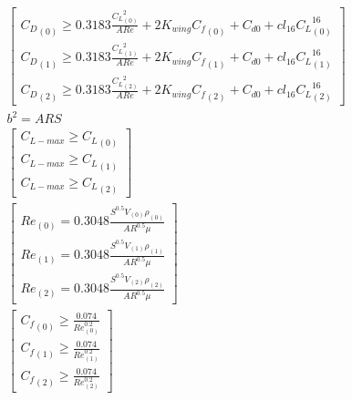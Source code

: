 \documentclass[10pt, a4paper]{article}
\begin{document}
\[ \begin{array}{ll}
	& \begin{bmatrix}{C_D}_{(0)} \geq 0.3183\frac{{C_L}_{(0)}^{2}}{AR e} + 2K_{wing} {C_f}_{(0)} + C_{d0} + cl_{16} {C_L}_{(0)}^{16} \\ {C_D}_{(1)} \geq 0.3183\frac{{C_L}_{(1)}^{2}}{AR e} + 2K_{wing} {C_f}_{(1)} + C_{d0} + cl_{16} {C_L}_{(1)}^{16} \\ {C_D}_{(2)} \geq 0.3183\frac{{C_L}_{(2)}^{2}}{AR e} + 2K_{wing} {C_f}_{(2)} + C_{d0} + cl_{16} {C_L}_{(2)}^{16}\end{bmatrix} \\
	& b^{2} = AR S \\
	& \begin{bmatrix}C_{L-max} \geq {C_L}_{(0)} \\ C_{L-max} \geq {C_L}_{(1)} \\ C_{L-max} \geq {C_L}_{(2)}\end{bmatrix} \\
	& \begin{bmatrix}{Re}_{(0)} = 0.3048\frac{S^{0.5} {V}_{(0)} {\rho}_{(0)}}{AR^{0.5} \mu} \\ {Re}_{(1)} = 0.3048\frac{S^{0.5} {V}_{(1)} {\rho}_{(1)}}{AR^{0.5} \mu} \\ {Re}_{(2)} = 0.3048\frac{S^{0.5} {V}_{(2)} {\rho}_{(2)}}{AR^{0.5} \mu}\end{bmatrix} \\
	& \begin{bmatrix}{C_f}_{(0)} \geq \frac{0.074}{{Re}_{(0)}^{0.2}} \\ {C_f}_{(1)} \geq \frac{0.074}{{Re}_{(1)}^{0.2}} \\ {C_f}_{(2)} \geq \frac{0.074}{{Re}_{(2)}^{0.2}}\end{bmatrix} \\
\end{array} \]
\end{document}
